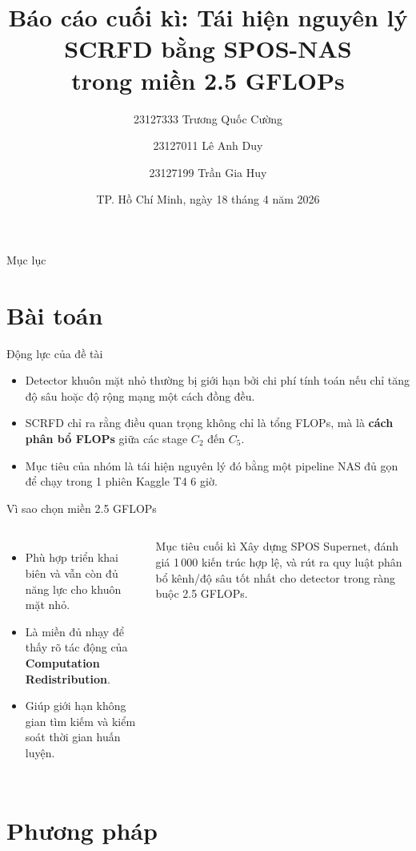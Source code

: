 \documentclass[aspectratio=169,11pt]{beamer}
\title[Final -- Nhận dạng]{Báo cáo cuối kì: Tái hiện nguyên lý SCRFD bằng SPOS-NAS\\trong miền 2.5 GFLOPs}
\author[Nhóm 23KHMT]{23127333 Trương Quốc Cường \and 23127011 Lê Anh Duy \and 23127199 Trần Gia Huy}
\institute[HCMUS]{CSC14006 -- Nhận dạng\\Trường ĐH Khoa học Tự nhiên, ĐHQG-HCM}
\date[18/04/2026]{TP. Hồ Chí Minh, ngày 18 tháng 4 năm 2026}
\begin{document}
\begin{frame}
  \titlepage
\end{frame}

\begin{frame}{Mục lục}
  \tableofcontents
\end{frame}

\section{Bài toán}

\begin{frame}{Động lực của đề tài}
  \begin{itemize}
    \setlength{\itemsep}{6pt}
    \item Detector khuôn mặt nhỏ thường bị giới hạn bởi chi phí tính toán nếu chỉ tăng độ sâu hoặc độ rộng mạng một cách đồng đều.
    \item SCRFD chỉ ra rằng điều quan trọng không chỉ là tổng FLOPs, mà là \textbf{cách phân bổ FLOPs} giữa các stage \(C_2\) đến \(C_5\). \cite{guo2022scrfd}
    \item Mục tiêu của nhóm là tái hiện nguyên lý đó bằng một pipeline NAS đủ gọn để chạy trong 1 phiên Kaggle T4 6 giờ.
  \end{itemize}
\end{frame}

\begin{frame}{Vì sao chọn miền 2.5 GFLOPs}
  \begin{columns}[T,onlytextwidth]
    \begin{itemize}
      \setlength{\itemsep}{5pt}
      \item Phù hợp triển khai biên và vẫn còn đủ năng lực cho khuôn mặt nhỏ.
      \item Là miền đủ nhạy để thấy rõ tác động của \textbf{Computation Redistribution}.
      \item Giúp giới hạn không gian tìm kiếm và kiểm soát thời gian huấn luyện.
    \end{itemize}
    \begin{block}{Mục tiêu cuối kì}
      Xây dựng SPOS Supernet, đánh giá 1\,000 kiến trúc hợp lệ, và rút ra quy luật phân bổ kênh/độ sâu tốt nhất cho detector trong ràng buộc 2.5 GFLOPs.
    \end{block}
  \end{columns}
\end{frame}

\section{Phương pháp}
\end{document}
